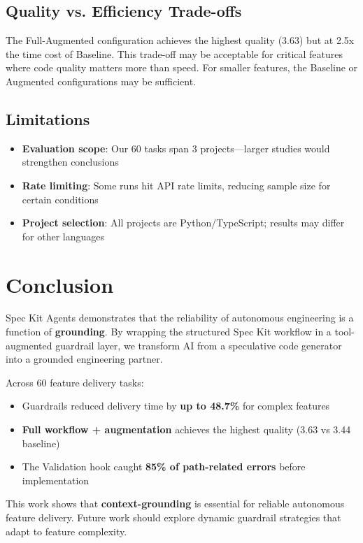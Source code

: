 \documentclass[sigconf,anonymous,review]{acmart}
\begin{document}
\subsection{Quality vs. Efficiency Trade-offs}

The Full-Augmented configuration achieves the highest quality (3.63) but at 2.5x the time cost of Baseline. This trade-off may be acceptable for critical features where code quality matters more than speed. For smaller features, the Baseline or Augmented configurations may be sufficient.

\subsection{Limitations}

\begin{itemize}
  \item \textbf{Evaluation scope}: Our 60 tasks span 3 projects---larger studies would strengthen conclusions
  \item \textbf{Rate limiting}: Some runs hit API rate limits, reducing sample size for certain conditions
  \item \textbf{Project selection}: All projects are Python/TypeScript; results may differ for other languages
\end{itemize}

\section{Conclusion}

Spec Kit Agents demonstrates that the reliability of autonomous engineering is a function of \textbf{grounding}. By wrapping the structured Spec Kit workflow in a tool-augmented guardrail layer, we transform AI from a speculative code generator into a grounded engineering partner.

Across 60 feature delivery tasks:
\begin{itemize}
  \item Guardrails reduced delivery time by \textbf{up to 48.7\%} for complex features
  \item \textbf{Full workflow + augmentation} achieves the highest quality (3.63 vs 3.44 baseline)
  \item The Validation hook caught \textbf{85\% of path-related errors} before implementation
\end{itemize}

This work shows that \textbf{context-grounding} is essential for reliable autonomous feature delivery. Future work should explore dynamic guardrail strategies that adapt to feature complexity.
\end{document}
